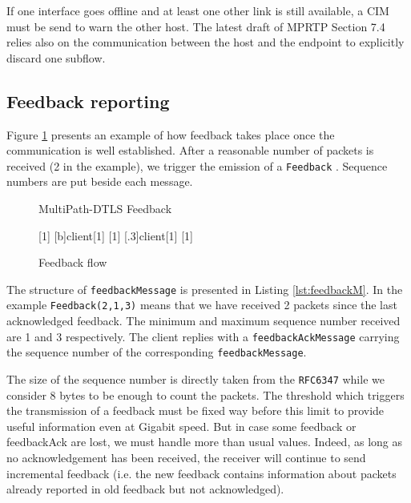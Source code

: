 If one interface goes offline and at least one other link is still available, a CIM must be send to warn the other host. The latest draft of MPRTP \cite{singh-avtcore-mprtp} Section 7.4 relies also on the communication between the host and the endpoint to explicitly discard one subflow.


\subsection{Feedback reporting}
\label{sec:feedbackReport}


Figure \ref{fig:feedback} presents an example of how feedback takes place once the communication is well established. After a reasonable number of packets is received (2 in the example), we trigger the emission of a \texttt{Feedback} . Sequence numbers are put beside each message.


\begin{figure}[!h]
\centering
\begin{msc}[r]{MultiPath-DTLS Feedback}

\setlength{\instfootheight}{0em}
\setlength{\instheadheight}{0em}
\setlength{\instdist}{0.5\linewidth}
\setlength{\levelheight}{3em}


[1]
\nextlevel
{}[b]{}{client}[1]
\nextlevel
{}[1]
\nextlevel
{}[.3]{client}[1]
\nextlevel
{}[1]
\nextlevel

\end{msc}
\caption{Feedback flow}
\label{fig:feedback}
\end{figure}

The structure of \texttt{feedbackMessage} is presented in Listing \ref{lst:feedbackM}. In the example \texttt{Feedback(2,1,3)} means that we have received 2 packets since the last acknowledged feedback. The minimum and maximum sequence number received are 1 and 3 respectively. The client replies with a \texttt{feedbackAckMessage} carrying the sequence number of the corresponding \texttt{feedbackMessage}.

The size of the sequence number is directly taken from the \texttt{RFC6347}\cite{rfc6347} while we consider 8 bytes to be enough to count the packets. The threshold which triggers the transmission of a feedback must be fixed way before this limit to provide useful information even at Gigabit speed. But in case some feedback or feedbackAck are lost, we must handle more than usual values. Indeed, as long as no acknowledgement has been received, the receiver will continue to send incremental feedback (i.e. the new feedback contains information about packets already reported in old feedback but not acknowledged).


